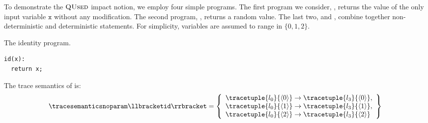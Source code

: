 \begin{example}
  To demonstrate the $\textup{\textsc{QUsed}}$ impact notion, we employ four simple programs.
  The first program we consider, , returns the value of the only input variable $\texttt{x}$ without any modification.
  The second program, , returns a random value.
  The last two,  and , combine together non-deterministic and deterministic statements.
  For simplicity, variables are assumed to range in $\{0, 1, 2\}$.

  \begin{marginlisting}
    \caption{The identity program.}
    \vspace{15pt}
  \begin{lstlisting}[language=customPython]
id(x):
  return x;
 \end{lstlisting}
  \end{marginlisting}
  The trace semantics of  is:
  \begin{align*}
    \tracesemanticsnoparam\semanticsof{\texttt{id}}
    =
    \left\{
      \begin{array}{l}
        \tracetuple{\locinit}{\langle 0\rangle}\rightarrow\tracetuple{\loc{3}}{\langle 0\rangle},\\
        \tracetuple{\locinit}{\langle 1\rangle}\rightarrow\tracetuple{\loc{3}}{\langle 1\rangle},\\
        \tracetuple{\locinit}{\langle 2\rangle}\rightarrow\tracetuple{\loc{3}}{\langle 2\rangle}
      \end{array}
    \right\}
  \end{align*}
  \begin{marginfigure}[*-1.5]
\end{marginfigure}
\end{example}
